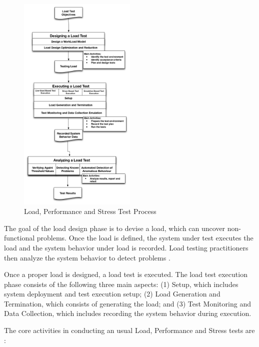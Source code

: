\documentclass[times]{stvrauth}
\begin{document}
\begin{figure}[!ht]
\centering
\includegraphics[width=0.5\textwidth]{./images/testprocess.png}
\caption{Load, Performance and Stress Test Process \cite{Jiang2010}\cite{Erinle2013}}
\label{fig:testprocess}
\end{figure}


The goal of the load design phase is to devise a load, which can uncover non-functional problems. Once the load is defined, the system under test executes the load and the system behavior under load is recorded. Load testing practitioners then analyze the system behavior to detect problems \cite{Jiang2010}. 

Once a proper load is designed, a load test is executed. The load test execution phase consists of the following three main aspects: (1) Setup, which includes system deployment and test execution setup; (2) Load Generation and Termination, which consists of generating the load; and (3) Test Monitoring and Data Collection, which includes recording the system behavior during execution\cite{Jiang2010}. 

The core activities in conducting an usual Load, Performance and Stress tests are \cite{Erinle2013}: 
\end{document}
